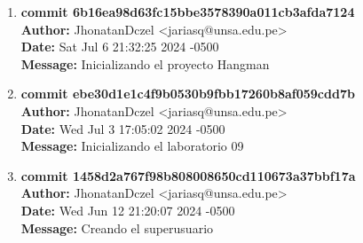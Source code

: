 \begin{enumerate}[label=Commit \arabic*]
    \item \textbf{commit 6b16ea98d63fc15bbe3578390a011cb3afda7124} \\
    \textbf{Author:} JhonatanDczel <jariasq@unsa.edu.pe> \\
    \textbf{Date:} Sat Jul 6 21:32:25 2024 -0500 \\
    \textbf{Message:} Inicializando el proyecto Hangman

    \item \textbf{commit ebe30d1e1c4f9b0530b9fbb17260b8af059cdd7b} \\
    \textbf{Author:} JhonatanDczel <jariasq@unsa.edu.pe> \\
    \textbf{Date:} Wed Jul 3 17:05:02 2024 -0500 \\
    \textbf{Message:} Inicializando el laboratorio 09

    \item \textbf{commit 1458d2a767f98b808008650cd110673a37bbf17a} \\
    \textbf{Author:} JhonatanDczel <jariasq@unsa.edu.pe> \\
    \textbf{Date:} Wed Jun 12 21:20:07 2024 -0500 \\
    \textbf{Message:} Creando el superusuario
\end{enumerate}